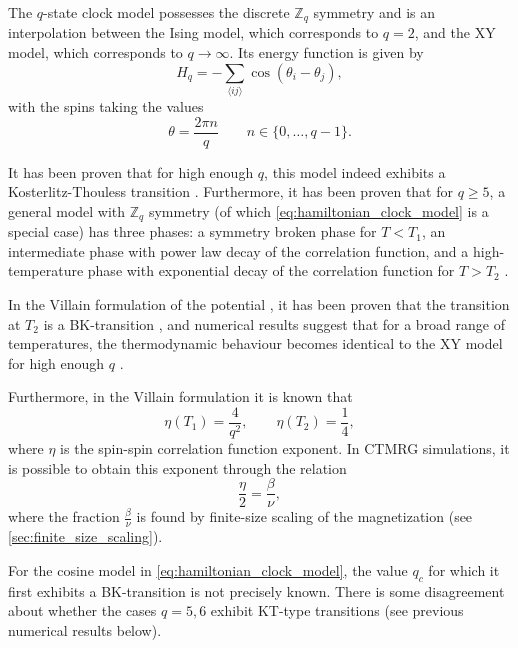 The $q$-state clock model possesses the discrete $\mathbb{Z}_q$ symmetry and is an interpolation between the Ising
model, which corresponds to $q = 2$, and the XY model, which corresponds to $q \to \infty$. Its energy function is given
by
\begin{equation}\label{eq:hamiltonian_clock_model}
  H_q = -\sum_{\langle i j \rangle} \cos(\theta_i - \theta_j),
\end{equation}
with the spins taking the values
\begin{equation}
  \theta = \frac{2 \pi n}{q} \qquad n \in \{ 0, \dots, q-1 \}.
\end{equation}

It has been proven that for high enough $q$, this model indeed exhibits a Kosterlitz-Thouless transition
\cite{frohlich1981kosterlitz}. Furthermore, it has been proven that for $q \geq 5$, a general model with $\mathbb{Z}_q$
symmetry (of which \autoref{eq:hamiltonian_clock_model} is a special case) has three phases: a symmetry broken phase for
$T < T_1$, an intermediate phase with power law decay of the correlation function, and a high-temperature phase with
exponential decay of the correlation function for $T > T_2$ \cite{cardy1980general}.

In the Villain formulation of the potential \cite{villain1975theory}, it has been proven that the transition at $T_2$ is
a BK-transition \cite{jose1977renormalization}, and numerical results suggest that for a broad range of temperatures,
the thermodynamic behaviour becomes identical to the XY model for high enough $q$ \cite{lapilli2006universality}.

Furthermore, in the Villain formulation it is known that \cite{elitzur1979phase, nienhuis1984critical}
\begin{equation}\label{eq:eta_villain}
  \eta(T_1) =\frac{4}{q^2}, \qquad \eta(T_2) = \frac{1}{4},
\end{equation}
where $\eta$ is the spin-spin correlation function exponent.
In CTMRG simulations, it is possible to obtain this exponent through the relation
\begin{equation}
  \frac{\eta}{2} = \frac{\beta}{\nu},
\end{equation}
where the fraction $\frac{\beta}{\nu}$ is found by finite-size scaling of the magnetization (see
\autoref{sec:finite_size_scaling}).

For the cosine model in \autoref{eq:hamiltonian_clock_model}, the value $q_c$ for which it first exhibits a
BK-transition is not precisely known.
There is some disagreement about whether the cases $q = 5, 6$ exhibit KT-type transitions (see previous numerical
results below).

